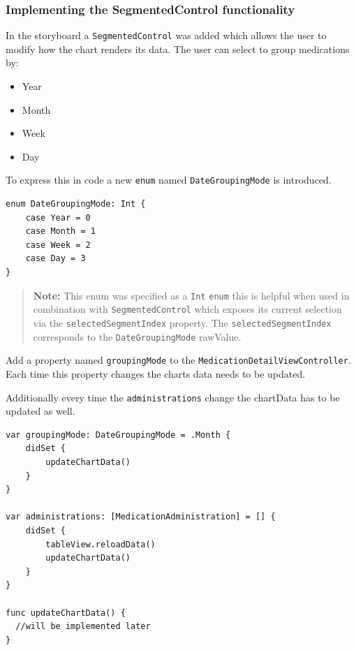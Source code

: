 \documentclass{article}
\begin{document}
\subsubsection{Implementing the SegmentedControl functionality}\label{implementing-the-segmentedcontrol-functionality}

In the storyboard a \texttt{SegmentedControl} was added which allows the
user to modify how the chart renders its data. The user can select to
group medications by:

\begin{itemize}
  \item
    Year
  \item
    Month
  \item
    Week
  \item
    Day
\end{itemize}

To express this in code a new \texttt{enum} named
\texttt{DateGroupingMode} is introduced.

\begin{verbatim}
enum DateGroupingMode: Int {
    case Year = 0
    case Month = 1
    case Week = 2
    case Day = 3
}
\end{verbatim}

\begin{quote}
\textbf{Note:} This enum was specified as a \texttt{Int} \texttt{enum}
this is helpful when used in combination with \texttt{SegmentedControl}
which exposes its current selection via the
\texttt{selectedSegmentIndex} property. The
\texttt{selectedSegmentIndex} corresponds to the
\texttt{DateGroupingMode} rawValue.
\end{quote}

Add a property named \texttt{groupingMode} to the
\texttt{MedicationDetailViewController}. Each time this property changes
the charts data needs to be updated.

Additionally every time the \texttt{administrations} change the
chartData has to be updated as well.

\begin{verbatim}
var groupingMode: DateGroupingMode = .Month {
    didSet {
        updateChartData()
    }
}

var administrations: [MedicationAdministration] = [] {
    didSet {
        tableView.reloadData()
        updateChartData()
    }
}

func updateChartData() {
  //will be implemented later
}
\end{verbatim}
\end{document}
